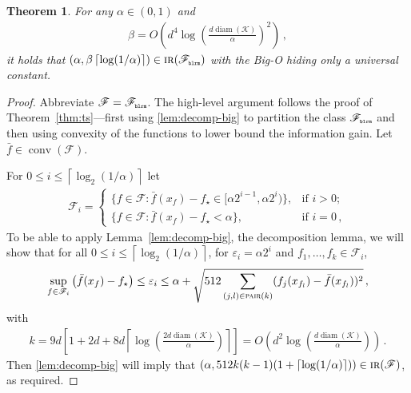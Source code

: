 \documentclass[letter, 12pt]{report}
\newcommand{\pr}{\text{\tiny\texttt{r}}}
\newcommand{\pb}{\text{\tiny\texttt{b}}}
\newcommand{\pl}{\text{\tiny\texttt{l}}}
\renewcommand{\pm}{\text{\tiny\texttt{m}}}
\newcommand{\ceil}[1]{\left\lceil #1 \right\rceil}
\newcommand{\pair}{\operatorname{\textsc{pair}}}
\newcommand{\cK}{\mathcal K}
\newcommand{\sF}{\mathscr F}
\newcommand{\conv}{\operatorname{conv}}
\newcommand{\diam}{\operatorname{diam}}
\newcommand{\1}{\mathbf{1}}
\newcommand{\IR}{\operatorname{\textsc{ir}}}
\renewcommand{\epsilon}{\varepsilon}
\theoremstyle{plain}
\newtheorem{theorem}{Theorem}
\theoremstyle{definition}
\theoremstyle{remark}
\begin{document}
\begin{theorem}\label{thm:ridge-ir}
    For any $\alpha \in (0,1)$ and
    \begin{align*}
        \beta = O\left(d^4 \log\left(\frac{d \diam(\cK)}{\alpha}\right)^2\right) \,,
    \end{align*}
    it holds that $(\alpha, \beta \ceil{\log(1/\alpha)}) \in \IR(\sF_{\pb\pl\pr\pm})$ with the Big-O hiding only a universal constant.
\end{theorem}

\begin{proof}
    Abbreviate $\sF = \sF_{\pb\pl\pr\pm}$.
    The high-level argument follows the proof of Theorem~\ref{thm:ts}---first using \cref{lem:decomp-big} to partition the class $\sF_{\pb\pl\pr\pm}$ and then using convexity of the functions to lower bound the information gain.
    Let $\bar{f} \in \conv(\sF)$.

    For $0 \leq i \leq \ceil{\log_2(1/\alpha)}$ let
    \begin{align*}
        \sF_i = \begin{cases}
                    \{f \in \sF : \bar f(x_f) - f_\star \in [\alpha 2^{i-1}, \alpha 2^{i})\}, & \text{if } i > 0;    \\
                    \{f \in \sF : \bar f(x_f) - f_\star < \alpha\},                           & \text{if } i = 0 \,,
                \end{cases}
    \end{align*}
    To be able to apply Lemma~\ref{lem:decomp-big}, the decomposition lemma, we will show that for all $0 \leq i \leq \ceil{\log_2(1/\alpha)}$,
    for $\epsilon_i = \alpha 2^i$ and $f_1,\ldots,f_k \in \sF_i$,
    \begin{align}
        \sup_{f \in \sF_i} \left(\bar f(x_f) - f_\star\right) \leq \epsilon_i \leq \alpha + \sqrt{512 \sum_{(j, l) \in \pair(k)} (f_j(x_{f_l}) - \bar f(x_{f_l}))^2}\,,
        \label{eq:ridge:condition}
    \end{align}
    with
    \begin{align*}
        k = 9d\left[1 + 2d + 8d\ceil{\log\left(\frac{2d \diam(\cK)}{\alpha}\right)}\right] = O\left(d^2 \log\left(\frac{d \diam(\cK)}{\alpha}\right)\right) \,.
    \end{align*}
    Then \cref{lem:decomp-big} will imply that $(\alpha, 512k(k-1) (1 + \ceil{\log(1/\alpha)})) \in \IR(\sF)$, as required.


\end{proof}
\end{document}
